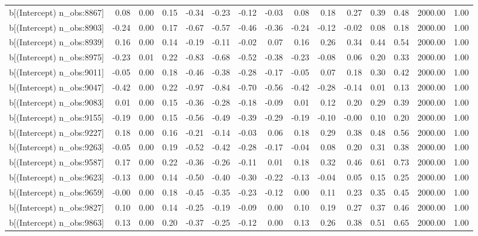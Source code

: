 \begin{table}[ht]
\begin{tabular}{rrrrrrrrrrrrrrr}
  b[(Intercept) n\_obs:8867] & 0.08 & 0.00 & 0.15 & -0.34 & -0.23 & -0.12 & -0.03 & 0.08 & 0.18 & 0.27 & 0.39 & 0.48 & 2000.00 & 1.00 \\ 
  b[(Intercept) n\_obs:8903] & -0.24 & 0.00 & 0.17 & -0.67 & -0.57 & -0.46 & -0.36 & -0.24 & -0.12 & -0.02 & 0.08 & 0.18 & 2000.00 & 1.00 \\ 
  b[(Intercept) n\_obs:8939] & 0.16 & 0.00 & 0.14 & -0.19 & -0.11 & -0.02 & 0.07 & 0.16 & 0.26 & 0.34 & 0.44 & 0.54 & 2000.00 & 1.00 \\ 
  b[(Intercept) n\_obs:8975] & -0.23 & 0.01 & 0.22 & -0.83 & -0.68 & -0.52 & -0.38 & -0.23 & -0.08 & 0.06 & 0.20 & 0.33 & 2000.00 & 1.00 \\ 
  b[(Intercept) n\_obs:9011] & -0.05 & 0.00 & 0.18 & -0.46 & -0.38 & -0.28 & -0.17 & -0.05 & 0.07 & 0.18 & 0.30 & 0.42 & 2000.00 & 1.00 \\ 
  b[(Intercept) n\_obs:9047] & -0.42 & 0.00 & 0.22 & -0.97 & -0.84 & -0.70 & -0.56 & -0.42 & -0.28 & -0.14 & 0.01 & 0.13 & 2000.00 & 1.00 \\ 
  b[(Intercept) n\_obs:9083] & 0.01 & 0.00 & 0.15 & -0.36 & -0.28 & -0.18 & -0.09 & 0.01 & 0.12 & 0.20 & 0.29 & 0.39 & 2000.00 & 1.00 \\ 
  b[(Intercept) n\_obs:9155] & -0.19 & 0.00 & 0.15 & -0.56 & -0.49 & -0.39 & -0.29 & -0.19 & -0.10 & -0.00 & 0.10 & 0.20 & 2000.00 & 1.00 \\ 
  b[(Intercept) n\_obs:9227] & 0.18 & 0.00 & 0.16 & -0.21 & -0.14 & -0.03 & 0.06 & 0.18 & 0.29 & 0.38 & 0.48 & 0.56 & 2000.00 & 1.00 \\ 
  b[(Intercept) n\_obs:9263] & -0.05 & 0.00 & 0.19 & -0.52 & -0.42 & -0.28 & -0.17 & -0.04 & 0.08 & 0.20 & 0.31 & 0.38 & 2000.00 & 1.00 \\ 
  b[(Intercept) n\_obs:9587] & 0.17 & 0.00 & 0.22 & -0.36 & -0.26 & -0.11 & 0.01 & 0.18 & 0.32 & 0.46 & 0.61 & 0.73 & 2000.00 & 1.00 \\ 
  b[(Intercept) n\_obs:9623] & -0.13 & 0.00 & 0.14 & -0.50 & -0.40 & -0.30 & -0.22 & -0.13 & -0.04 & 0.05 & 0.15 & 0.25 & 2000.00 & 1.00 \\ 
  b[(Intercept) n\_obs:9659] & -0.00 & 0.00 & 0.18 & -0.45 & -0.35 & -0.23 & -0.12 & 0.00 & 0.11 & 0.23 & 0.35 & 0.45 & 2000.00 & 1.00 \\ 
  b[(Intercept) n\_obs:9827] & 0.10 & 0.00 & 0.14 & -0.25 & -0.19 & -0.09 & 0.00 & 0.10 & 0.19 & 0.27 & 0.37 & 0.46 & 2000.00 & 1.00 \\ 
  b[(Intercept) n\_obs:9863] & 0.13 & 0.00 & 0.20 & -0.37 & -0.25 & -0.12 & 0.00 & 0.13 & 0.26 & 0.38 & 0.51 & 0.65 & 2000.00 & 1.00 \\ 

\end{tabular}
\end{table}
